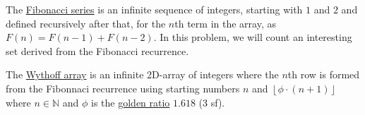 \documentclass[addpoints]{exam}
\begin{document}
\begin{questions}

\question
    The \href{https://en.wikipedia.org/wiki/Fibonacci_number}{Fibonacci series} is an infinite sequence of integers, starting with $1$ and $2$ and defined recursively after that, for the $n$th term in the array, as $F(n) = F(n-1) + F(n-2)$. In this problem, we will count an interesting set derived from the Fibonacci recurrence.
    
The \href{http://www.maths.surrey.ac.uk/hosted-sites/R.Knott/Fibonacci/fibGen.html#section6.2}{Wythoff array} is an infinite 2D-array of integers where the $n$th row is formed from the Fibonnaci recurrence using starting numbers $n$ and $\left \lfloor{\phi\cdot (n+1)}\right \rfloor$ where $n \in \mathbb{N}$ and $\phi$ is the \href{https://en.wikipedia.org/wiki/Golden_ratio}{golden ratio} $1.618$ (3 sf).


\end{questions}
\end{document}
